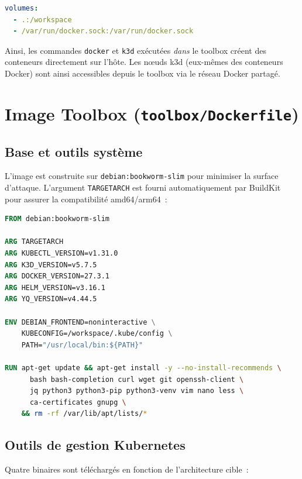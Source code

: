 \documentclass[12pt,a4paper]{report}
\begin{document}
\begin{lstlisting}[language=yaml, caption={Montage du socket Docker dans docker-compose.yml}, label={lst:docker_socket}]
volumes:
  - .:/workspace
  - /var/run/docker.sock:/var/run/docker.sock
\end{lstlisting}

Ainsi, les commandes \texttt{docker} et \texttt{k3d} exécutées \emph{dans} le toolbox créent des conteneurs directement sur l'hôte. Les nœuds k3d (eux-mêmes des conteneurs Docker) sont ainsi accessibles depuis le toolbox via le réseau Docker partagé.

\section{Image Toolbox (\texttt{toolbox/Dockerfile})}

\subsection{Base et outils système}
L'image est construite sur \texttt{debian:bookworm-slim} pour minimiser la surface d'attaque. L'argument \texttt{TARGETARCH} est fourni automatiquement par BuildKit pour assurer la compatibilité amd64/arm64~:

\begin{lstlisting}[language=Dockerfile, caption={En-tête du Dockerfile toolbox}, label={lst:toolbox_header}]
FROM debian:bookworm-slim

ARG TARGETARCH
ARG KUBECTL_VERSION=v1.31.0
ARG K3D_VERSION=v5.7.5
ARG DOCKER_VERSION=27.3.1
ARG HELM_VERSION=v3.16.1
ARG YQ_VERSION=v4.44.5

ENV DEBIAN_FRONTEND=noninteractive \
    KUBECONFIG=/workspace/.kube/config \
    PATH="/usr/local/bin:${PATH}"

RUN apt-get update && apt-get install -y --no-install-recommends \
      bash bash-completion curl wget git openssh-client \
      jq python3 python3-pip python3-venv vim nano less \
      ca-certificates gnupg \
    && rm -rf /var/lib/apt/lists/*
\end{lstlisting}

\subsection{Outils de gestion Kubernetes}
Quatre binaires sont téléchargés en fonction de l'architecture cible~:
\end{document}
